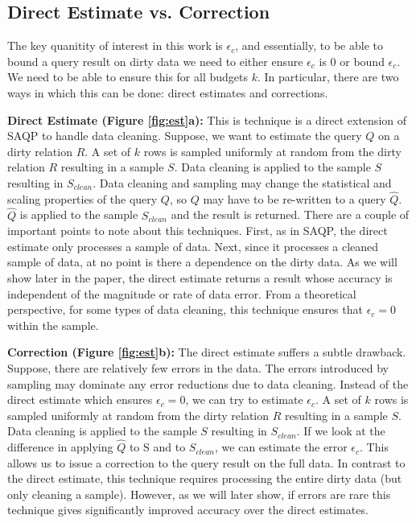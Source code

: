 \subsection{Direct Estimate vs. Correction}
The key quanitity of interest in this work is $\epsilon_c$, and essentially, to be able to bound
a query result on dirty data we need to either ensure $\epsilon_c$ is 0 or bound $\epsilon_c$.
We need to be able to ensure this for all budgets $k$.
In particular, there are two ways in which this can be done: direct estimates and corrections.

\vspace{0.5em}
\noindent\textbf{Direct Estimate (Figure \ref{fig:est}a): } This is technique is a direct extension of SAQP to handle data cleaning. Suppose, we want to estimate the query $Q$ on a dirty relation $R$. A set of $k$ rows is sampled uniformly at random from the dirty relation $R$ resulting in a sample $S$. Data cleaning is applied to the sample $S$ resulting in $S_{clean}$.
Data cleaning and sampling may change the statistical and scaling properties of the query $Q$, so $Q$ may have to be re-written to a query $\widehat{Q}$. $\widehat{Q}$ is applied to the sample $S_{clean}$ and the result is returned. 
There are a couple of important points to note about this techniques.
First, as in SAQP, the direct estimate only processes a sample of data.
Next, since it processes a cleaned sample of data, at no point is there a dependence on the dirty data.
As we will show later in the paper, the direct estimate returns a result whose accuracy is independent of the magnitude or rate of data error. 
From a theoretical perspective, for some types of data cleaning, this technique ensures that $\epsilon_c = 0$ within the sample.

\vspace{0.5em}
\noindent\textbf{Correction (Figure \ref{fig:est}b): } The direct estimate suffers a subtle drawback. Suppose, there are relatively few errors in the data. The errors introduced by sampling may dominate any error reductions due to data cleaning. Instead of the direct estimate which ensures $\epsilon_c = 0$, we can try to estimate $\epsilon_c$. A set of $k$ rows is sampled uniformly at random from the dirty relation $R$ resulting in a sample $S$. Data cleaning is applied to the sample $S$ resulting in $S_{clean}$. 
If we look at the difference in applying $\widehat{Q}$ to S and to $S_{clean}$, we can estimate the error $\epsilon_c$. 
This allows us to issue a correction to the query result on the full data.
In contrast to the direct estimate, this technique requires processing the entire dirty data (but only cleaning a sample).
However, as we will later show, if errors are rare this technique gives significantly improved accuracy over the direct estimates.

